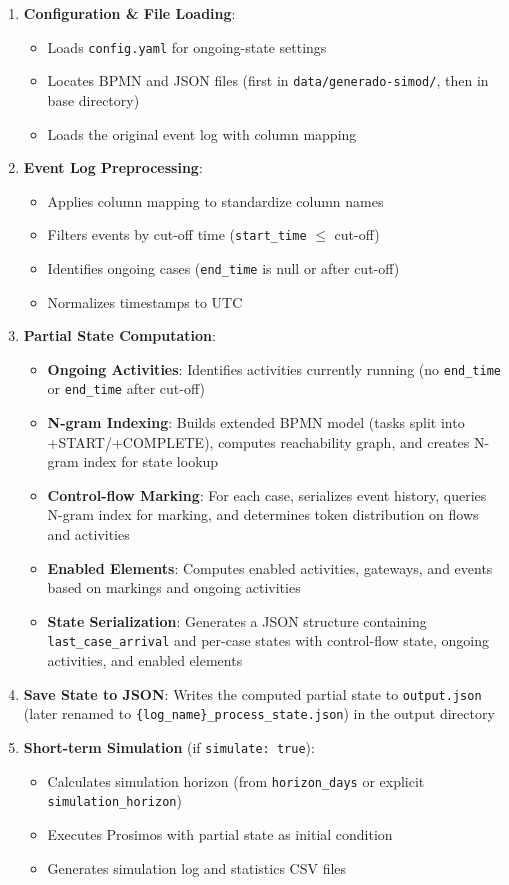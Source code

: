 \documentclass[a4paper]{article}
\begin{document}
\begin{enumerate}
    \item \textbf{Configuration \& File Loading}: 
\begin{itemize}
        \item Loads \texttt{config.yaml} for ongoing-state settings
        \item Locates BPMN and JSON files (first in \texttt{data/generado-simod/}, then in base directory)
        \item Loads the original event log with column mapping
\end{itemize}
    \item \textbf{Event Log Preprocessing}:
\begin{itemize}
        \item Applies column mapping to standardize column names
        \item Filters events by cut-off time (\texttt{start\_time} $\leq$ cut-off)
        \item Identifies ongoing cases (\texttt{end\_time} is null or after cut-off)
        \item Normalizes timestamps to UTC
\end{itemize}
    \item \textbf{Partial State Computation}:
\begin{itemize}
        \item \textbf{Ongoing Activities}: Identifies activities currently running (no \texttt{end\_time} or \texttt{end\_time} after cut-off)
        \item \textbf{N-gram Indexing}: Builds extended BPMN model (tasks split into +START/+COMPLETE), computes reachability graph, and creates N-gram index for state lookup
        \item \textbf{Control-flow Marking}: For each case, serializes event history, queries N-gram index for marking, and determines token distribution on flows and activities
        \item \textbf{Enabled Elements}: Computes enabled activities, gateways, and events based on markings and ongoing activities
        \item \textbf{State Serialization}: Generates a JSON structure containing \texttt{last\_case\_arrival} and per-case states with control-flow state, ongoing activities, and enabled elements
\end{itemize}
    \item \textbf{Save State to JSON}: Writes the computed partial state to \texttt{output.json} (later renamed to \texttt{\{log\_name\}\_process\_state.json}) in the output directory
    \item \textbf{Short-term Simulation} (if \texttt{simulate: true}):
\begin{itemize}
        \item Calculates simulation horizon (from \texttt{horizon\_days} or explicit \texttt{simulation\_horizon})
        \item Executes Prosimos with partial state as initial condition
        \item Generates simulation log and statistics CSV files
\end{itemize}
\end{enumerate}
\end{document}
